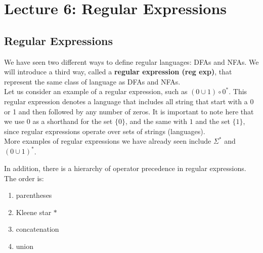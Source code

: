 \documentclass[11pt,a4paper]{article}
\begin{document}


\section{Lecture 6: Regular Expressions}
\subsection{Regular Expressions}

We have seen two different ways to define regular languages: DFAs and NFAs. We
will introduce a third way, called a \textbf{regular expression (reg exp)}, that represent the same class of
language as DFAs and NFAs. \\

Let us consider an example of a regular expression, such as $(0\cup 1)\circ 0^*$.
This regular expression denotes a language that includes all string that start with a 0 or 1 and then followed by any number of zeros.
It is important to note here that we use $0$ as a shorthand for the set $\{0\}$, and the same with $1$ and the set $\{1\}$, since regular expressions operate over sets of strings (languages). \\

More examples of regular expressions we have already seen include $\Sigma^*$ and $(0\cup1)^*$.

In addition, there is a hierarchy of operator precedence in regular expressions. The order is:
\begin{enumerate}
    \item parentheses
    \item Kleene star $*$
    \item concatenation
    \item union
\end{enumerate}
\end{document}
